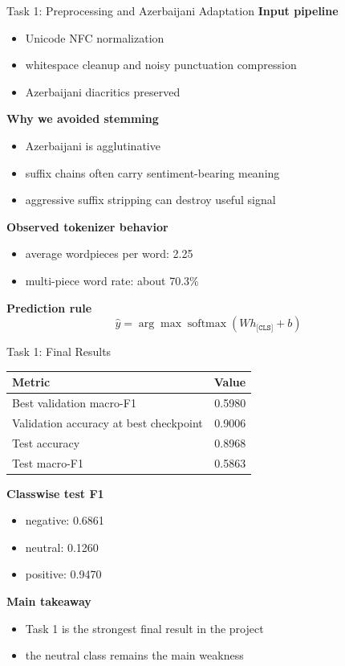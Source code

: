\documentclass{beamer}
\begin{document}
\begin{frame}{Task 1: Preprocessing and Azerbaijani Adaptation}
\small
\textbf{Input pipeline}
\begin{itemize}
  \item Unicode NFC normalization
  \item whitespace cleanup and noisy punctuation compression
  \item Azerbaijani diacritics preserved
\end{itemize}

\vspace{0.3em}
\textbf{Why we avoided stemming}
\begin{itemize}
  \item Azerbaijani is agglutinative
  \item suffix chains often carry sentiment-bearing meaning
  \item aggressive suffix stripping can destroy useful signal
\end{itemize}

\vspace{0.3em}
\textbf{Observed tokenizer behavior}
\begin{itemize}
  \item average wordpieces per word: 2.25
  \item multi-piece word rate: about 70.3\%
\end{itemize}

\vspace{0.3em}
\textbf{Prediction rule}
\[
\hat{y}=\arg\max \operatorname{softmax}(W h_{\texttt{[CLS]}} + b)
\]
\end{frame}

\begin{frame}{Task 1: Final Results}
\small
\begin{table}
\centering
\begin{tabular}{lr}
\toprule
Metric & Value \\
\midrule
Best validation macro-F1 & 0.5980 \\
Validation accuracy at best checkpoint & 0.9006 \\
Test accuracy & 0.8968 \\
Test macro-F1 & 0.5863 \\
\bottomrule
\end{tabular}
\end{table}

\vspace{0.3em}
\textbf{Classwise test F1}
\begin{itemize}
  \item negative: 0.6861
  \item neutral: 0.1260
  \item positive: 0.9470
\end{itemize}

\vspace{0.3em}
\textbf{Main takeaway}
\begin{itemize}
  \item Task 1 is the strongest final result in the project
  \item the neutral class remains the main weakness
\end{itemize}
\end{frame}
\end{document}
